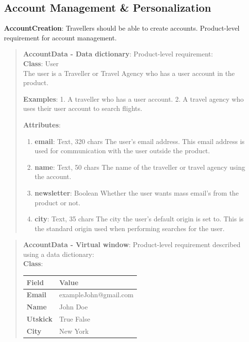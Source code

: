 \subsection{Account Management \& Personalization}
\textbf{AccountCreation}: Travellers should be able to create accounts. Product-level requirement for account management.
\begin{quote}
    \textbf{AccountData - Data dictionary}: Product-level requirement: \\\textbf{Class}: User\\
    The user is a Traveller or Travel Agency who has a user account in the product.
    
    \textbf{Examples}:
    1. A traveller who has a user account.
    2. A travel agency who uses their user account to search flights.
    
    \textbf{Attributes}:
    \begin{enumerate}
        \item \textbf{email}:      Text, 320 chars
        The user's email address. This email address is used for communication with the user outside the product.
        \item \textbf{name}:       Text, 50 chars
                The name of the traveller or travel agency using the account.
        \item \textbf{newsletter}: Boolean
        Whether the user wants mass email's from the product or not.
        \item \textbf{city}:       Text, 35 chars
        The city the user's default origin is set to. This is the standard origin used when performing searches for the user.
    \end{enumerate}    
\end{quote}

\begin{quote}
    \textbf{AccountData - Virtual window}: Product-level requirement described using a data dictionary: \\\textbf{Class}: \begin{longtable}{|p{3cm}|p{9cm}|}
        \hline
        \rowcolor{headergray}
        \textbf{Field} & \textbf{Value} \\ \hline
        \textbf{Email} & exampleJohn@gmail.com \\ \hline
        \textbf{Name} & John Doe \\ \hline
        \textbf{Utskick} & True \hspace{1em} False \\ \hline
        \textbf{City} & New York \\ \hline
    \end{longtable}
\end{quote}

